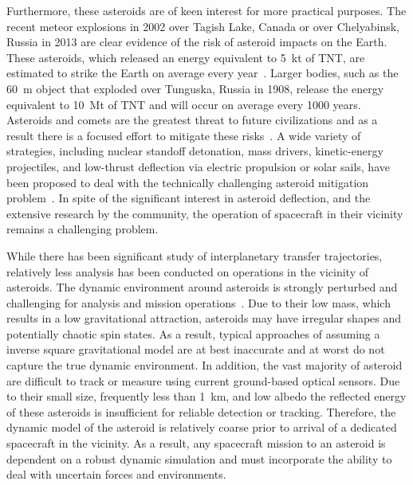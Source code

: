 \documentclass[letterpaper, paper,11pt]{AAS}		%
\begin{document}
Furthermore, these asteroids are of keen interest for more practical purposes.
The recent meteor explosions in  2002 over Tagish Lake, Canada or over Chelyabinsk, Russia in 2013 are clear evidence of the risk of asteroid impacts on the Earth.
These asteroids, which released an energy equivalent to \SI{5}{\kilo\tonne} of TNT, are estimated to strike the Earth on average every year~\cite{brown2002}.
Larger bodies, such as the \SI{60}{\meter} object that exploded over Tunguska, Russia in 1908, release the energy equivalent to \SI{10}{\mega\tonne} of TNT and will occur on average every \num{1000} years.
Asteroids and comets are the greatest threat to future civilizations and as a result there is a focused effort to mitigate these risks~\cite{wie2008}.
A wide variety of strategies, including nuclear standoff detonation, mass drivers, kinetic-energy projectiles, and low-thrust deflection via electric propulsion or solar sails, have been proposed to deal with the technically challenging asteroid mitigation problem~\cite{adams2004}.
In spite of the significant interest in asteroid deflection, and the extensive research by the community, the operation of spacecraft in their vicinity remains a challenging problem.

While there has been significant study of interplanetary transfer trajectories, relatively less analysis has been conducted on operations in the vicinity of asteroids.
The dynamic environment around asteroids is strongly perturbed and challenging for analysis and mission operations~\cite{scheeres1994,scheeres2000}.
Due to their low mass, which results in a low gravitational attraction, asteroids may have irregular shapes and potentially chaotic spin states.
As a result, typical approaches of assuming a inverse square gravitational model are at best inaccurate and at worst do not capture the true dynamic environment.
In addition, the vast majority of asteroid are difficult to track or measure using current ground-based optical sensors. 
Due to their small size, frequently less than \SI{1}{\kilo\meter}, and low albedo the reflected energy of these asteroids is insufficient for reliable detection or tracking.
Therefore, the dynamic model of the asteroid is relatively coarse prior to arrival of a dedicated spacecraft in the vicinity. 
As a result, any spacecraft mission to an asteroid is dependent on a robust dynamic simulation and must incorporate the ability to deal with uncertain forces and environments.
\end{document}
